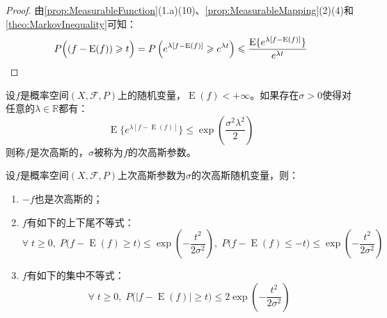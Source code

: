 \begin{proof}
	由\cref{prop:MeasurableFunction}(1.a)(10)、\cref{prop:MeasurableMapping}(2)(4)和\cref{theo:MarkovInequality}可知：
	\begin{equation*}
		P\Big((f-\operatorname{E}(f))\geqslant t\Big)=P\left(e^{\lambda[f-\operatorname{E}(f)]}\geqslant e^{\lambda t}\right)\leqslant\frac{\operatorname{E}\{e^{\lambda[f-\operatorname{E}(f)]}\}}{e^{\lambda t}}\qedhere
	\end{equation*}
\end{proof}
\begin{definition}
	设$f$是概率空间$(X,\mathscr{F},P)$上的随机变量，$\operatorname{E}(f)<+\infty$。如果存在$\sigma>0$使得对任意的$\lambda\in\mathbb{R}$都有：
	\begin{equation*}
		\operatorname{E}\{e^{\lambda[f-\operatorname{E}(f)]}\}\leqslant\exp\left(\frac{\sigma^2\lambda^2}{2}\right)
	\end{equation*}
	则称$f$是次高斯的，$\sigma$被称为$f$的次高斯参数。
\end{definition}
\begin{property}
	设$f$是概率空间$(X,\mathscr{F},P)$上次高斯参数为$\sigma$的次高斯随机变量，则：
	\begin{enumerate}
		\item $-f$也是次高斯的；
		\item $f$有如下的上下尾不等式：
		\begin{equation*}
			\forall\;t\geqslant0,\;P\Big(f-\operatorname{E}(f)\geqslant t\Big)\leqslant\exp\left(-\frac{t^2}{2\sigma^2}\right),\;P\Big(f-\operatorname{E}(f)\leqslant -t\Big)\leqslant\exp\left(-\frac{t^2}{2\sigma^2}\right)
		\end{equation*}
		\item $f$有如下的集中不等式：
		\begin{equation*}
			\forall\;t\geqslant0,\;P\Big(|f-\operatorname{E}(f)|\geqslant t\Big)\leqslant2\exp\left(-\frac{t^2}{2\sigma^2}\right)
		\end{equation*}
	\end{enumerate}
\end{property}
